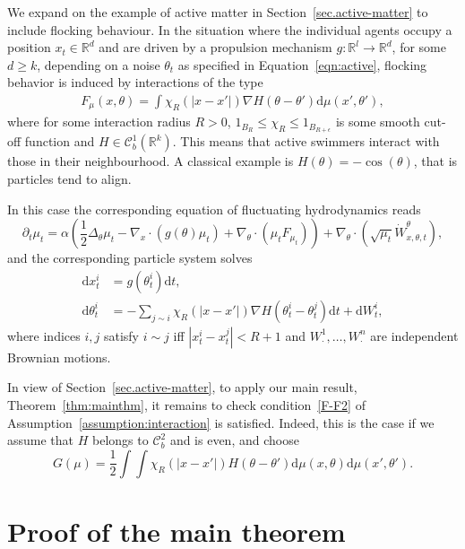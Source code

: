 \documentclass{article}
\newcommand{\dd}{\text{d}}
\newcommand{\R}{\mathbb{R}}
\newcommand{\C}{\mathcal C}
\begin{document}
We expand on the example of active matter in Section~\ref{sec.active-matter} to include flocking behaviour. In
the situation where the individual agents occupy a position $x_t \in \R^d$ and are driven by a propulsion
mechanism $g\colon \R^l \to \R^d$, for some $d \geq k$, depending on a noise $\theta_t$ as specified in
Equation~\eqref{eqn:active}, flocking behavior is induced by
interactions of the type
\begin{align}
  F_\mu(x, \theta) = \int \chi_R(|x-x'|) \nabla H(\theta-\theta') \dd \mu(x',\theta'),
  \label{eqn:activeinteraction}
\end{align}
where for some interaction radius $R >0$, $1_{B_R} \leq \chi_R \leq 1_{B_{R+\epsilon}}$ is some smooth cut-off
function and $H \in \C^1_b(\R^k)$. This means that active swimmers interact with those in their
neighbourhood. A classical example is $H(\theta) = -\cos(\theta)$, that is particles tend to align.

In this case the corresponding equation of fluctuating hydrodynamics  reads
\begin{equation*}
  \partial_t \mu_t = \alpha\left(\frac{1}{2} \Delta_\theta \mu_t -  \nabla_x
    \cdot (g(\theta) \mu_t) + \nabla_\theta \cdot (\mu_t F_{\mu_t})\right) +\nabla_\theta \cdot (\sqrt{\mu_t} \dot W_{x,\theta,t}^\theta),
\end{equation*}
and the corresponding particle system solves
\begin{align*}
    \dd x_t^i &= g(\theta_t^i)\dd t,\\
    \dd \theta_t^i &= -\sum_{j \sim i} \chi_R(|x-x'|) \nabla H( \theta_t^i - \theta_t^j) \dd t + \dd  W_t^i,
\end{align*}
where indices $i, j$ satisfy $i \sim j$ iff $|x_t^i -x_t^j| < R+1$ and $W_\cdot^1, \dots, W_\cdot^n$ are
independent Brownian motions.

In view of Section~\ref{sec.active-matter}, to apply our main result, Theorem~\ref{thm:mainthm}, it remains to
check condition~\ref{F-F2} of Assumption~\ref{assumption:interaction} is satisfied. Indeed, this is the case
if we assume that $H$ belongs to $\C^2_b$ and is even, and choose
\begin{equation*}
  G(\mu) = \frac{1}{2}\int\int \chi_R(|x-x'|) H(\theta - \theta')\dd \mu(x,\theta) \dd \mu(x',\theta').
\end{equation*}

\section{Proof of the main theorem}
\label{sec.proof}
\end{document}
